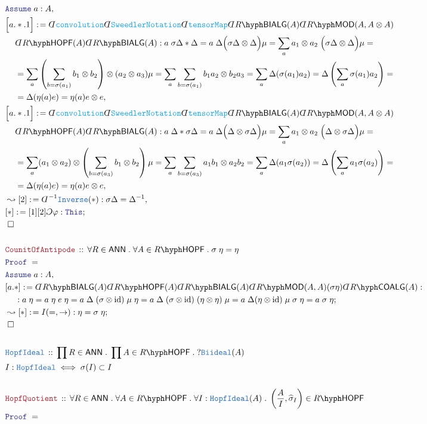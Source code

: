 \documentclass[12pt]{scrartcl}%
\newcommand{\TYPE}[1]{\textcolor{NavyBlue}{\mathtt{#1}}}%
\newcommand{\FUNC}[1]{\textcolor{Cerulean}{\mathtt{#1}}}%
\newcommand{\LOGIC}[1]{\textcolor{Blue}{\mathtt{#1}}}%
\newcommand{\THM}[1]{\textcolor{Maroon}{\mathtt{#1}}}%
\renewcommand{\.}{\; . \;} %
\newcommand{\de}{: \kern 0.1pc =} %
\newcommand{\Theorem}[2]{& \THM{#1} \, :: \, #2 \\ & \Proof = \\ } %
\newcommand{\DeclareType}[2]{& \TYPE{#1} \, :: \, #2 \\}%
\newcommand{\DefineType}[3]{& #1 : \TYPE{#2} \iff #3 \\}%
\newcommand{\NewLine}{\\ & \kern 1pc}%
\newcommand{\Page}[1]{ \begin{align*} #1 \end{align*}  }%
\newcommand{ \bd }{ \ByDef }%
\DeclareMathOperator*{\id}{id}%
\newcommand{\Say}[3]{& #1 \de #2 : #3, \\} %
\newcommand{\Conclude}[3]{& #1 \de #2 : #3; \\}%
\newcommand{\Derive}[3]{& \leadsto #1 \de #2 : #3, \\} %
\newcommand{\DeriveConclude}[3]{& \leadsto #1 \de #2 : #3 ; \\} %
\newcommand{\Assume}[2]{& \LOGIC{Assume} \; #1 : #2, \\} %
\newcommand{\QED}{\; \square} %
\newcommand{\EndProof}{& \QED \\} %
\newcommand{\ByDef}{\rotatebox[origin=c]{-180}{$D$}}%
\newcommand{\ByConstr}{\rotatebox[origin=c]{-180}{$C$}}%
\newcommand{\Proof}{\LOGIC{Proof} \; } %
\newcommand{\LMOD}[1]{#1\hyph\mathsf{MOD}} %
\newcommand{\ANN}{\mathsf{ANN}} %
\newcommand{\COALG}[1]{#1\hyph\mathsf{COALG}}%
\newcommand{\BIALG}[1]{#1\hyph\mathsf{BIALG}}%
\newcommand{\HOPF}[1]{#1\hyph\mathsf{HOPF}}%
\begin{document}
\Page{
	\Assume{a}{A}
	\Say{\Big[a.*.1\Big]}{
		\bd \FUNC{convolution} 
		\bd \FUNC{SweedlerNotation}
		\bd \FUNC{tensorMap}
		\bd \BIALG{R}(A)
		\bd \LMOD{R}(A,A \otimes A)
		\NewLine
		\bd \HOPF{R}(A)
		\bd \BIALG{R}(A)
	}
	{
		a \; \sigma \Delta * \Delta = 
		a \; \Delta \Big( \sigma \Delta \otimes \Delta  \Big) \mu = 
		\sum_a a_1 \otimes a_2 \;  \Big( \sigma \Delta \otimes \Delta \Big) \mu = \NewLine = 
		\sum_a  \left( \sum_{b = \sigma(a_1)} b_1 \otimes b_2    \right) \otimes (a_2 \otimes a_3) \mu =
		\sum_a \sum_{b = \sigma(a_1)} b_1a_2 \otimes b_2a_3 =
		\sum_a \Delta( \sigma(a_1)a_2  ) = 
		\Delta \left( \sum_a \sigma(a_1)a_2 \right) = \NewLine = 
		\Delta ( \eta(a) e ) = 
		\eta(a) e \otimes e
	} 
	\Say{\Big[a.*.1\Big]}{
		\bd \FUNC{convolution} 
		\bd \FUNC{SweedlerNotation}
		\bd \FUNC{tensorMap}
		\bd \BIALG{R}(A)
		\bd \LMOD{R}(A,A \otimes A)
		\NewLine
		\bd \HOPF{R}(A)
		\bd \BIALG{R}(A)
	}
	{
		a \;  \Delta * \sigma \Delta = 
		a \; \Delta \Big( \Delta \otimes \sigma \Delta  \Big) \mu = 
		\sum_a a_1 \otimes a_2 \;  \Big(  \Delta \otimes \sigma \Delta \Big) \mu = \NewLine = 
		\sum_a  (a_1 \otimes a_2) \otimes \left( \sum_{b = \sigma(a_3)} b_1 \otimes b_2    \right)  \mu =
		\sum_a \sum_{b = \sigma(a_3)} a_1b_1 \otimes a_2b_2 =
		\sum_a \Delta( a_1\sigma(a_2)   ) = 
		\Delta \left( \sum_a a_1\sigma(a_2) \right) = \NewLine = 
		\Delta ( \eta(a) e ) = 
		\eta(a) e \otimes e
	} 
	\Derive{[2]}{\bd^{-1}\TYPE{Inverse}(*)}
	{  \sigma \Delta  = \Delta^{-1}   }
	\Conclude{[*]}{[1][2]\ByConstr \varphi}{\LOGIC{This}}
	\EndProof
	\\
	\Theorem{CounitOfAntipode}{
		\forall R \in \ANN \. 
		\forall A \in \HOPF{R} \. 
		\sigma \; \eta = \eta
	}
	\Assume{a}{A}
	\Conclude{[a.*]}
	{
		\bd \BIALG{R}(A)
		\bd \HOPF{R}(A)
		\bd \BIALG{R}(A)
		\bd \LMOD{R}(A,A)(\sigma \eta)
		\bd \COALG{R}(A)
	}
	{
	     \NewLine : 
	     a \; \eta  =
	     a \; \eta \; e \; \eta =
	     a \; \Delta \; (\sigma \otimes \id) \; \mu \; \eta =
	     a \;  \Delta \; (\sigma \otimes \id) \; (\eta \otimes \eta) \; \mu =
	     a \;  \Delta (\eta \otimes \id) \; \mu \; \sigma \; \eta = 
	     a \; \sigma \; \eta
	}
	\DeriveConclude{[*]}{I(=,\to)}
	{
		\eta = \sigma \; \eta
	}
	\EndProof
	\\
	\DeclareType{HopfIdeal}{\prod R \in \ANN \. \prod A \in \HOPF{R} \. ?\TYPE{Biideal}(A)}
	\DefineType{I}{HopfIdeal}{\sigma(I) \subset I}
	\\
	\Theorem{HopfQuotient}
	{
		\forall R \in \ANN \.
		\forall A \in \HOPF{R} \. 
		\forall I : \TYPE{HopfIdeal}(A) \.
		\left( \frac{A}{I}, \widehat{\sigma}_I  \right) \in \HOPF{R}
}}
\end{document}
